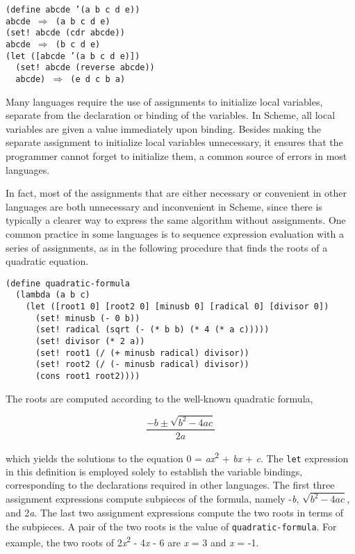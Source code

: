 \begin{alltt}
(define abcde '(a b c d e))
abcde \(\Rightarrow\) (a b c d e)
(set! abcde (cdr abcde))
abcde \(\Rightarrow\) (b c d e)
(let ([abcde '(a b c d e)])
  (set! abcde (reverse abcde))
  abcde) \(\Rightarrow\) (e d c b a)
\end{alltt}


Many languages require the use of assignments to initialize local
variables, separate from the declaration or binding of the variables.
In Scheme, all local variables are given a value immediately upon binding.
Besides making the separate assignment to initialize local variables
unnecessary, it ensures that the programmer cannot forget to initialize them,
a common source of errors in most languages.


In fact, most of the assignments that are either necessary or convenient in
other languages are both unnecessary and inconvenient in Scheme, since there
is typically a clearer way to express the same algorithm without assignments.
One common practice in some languages is to sequence expression evaluation
with a series of assignments, as in the following procedure that finds the
roots of a quadratic equation.


\begin{alltt}
(define quadratic-formula
  (lambda (a b c)
    (let ([root1 0] [root2 0] [minusb 0] [radical 0] [divisor 0])
      (set! minusb (- 0 b))
      (set! radical (sqrt (- (* b b) (* 4 (* a c)))))
      (set! divisor (* 2 a))
      (set! root1 (/ (+ minusb radical) divisor))
      (set! root2 (/ (- minusb radical) divisor))
      (cons root1 root2))))
\end{alltt}


The roots are computed according to the well-known quadratic formula,


\[\frac{-b \pm \sqrt{b^2-4ac}}{2a}\]


which yields the solutions to the equation 0 = \textit{ax}\textsuperscript{2} + \textit{bx} + \textit{c}.
The \texttt{let} expression in this definition is employed solely to establish
the variable bindings, corresponding to the declarations required in other
languages.
The first three assignment expressions compute subpieces of the formula,
namely -\textit{b}, \(\sqrt{b^2-4ac}\), and 2\textit{a}.
The last two assignment expressions compute the two roots in terms of the
subpieces.
A pair of the two roots is the value of \label{start_s166}\texttt{quadratic-formula}.
For example, the two roots of 2\textit{x}\textsuperscript{2} - 4\textit{x} - 6 are \textit{x} = 3 and \textit{x} = -1.


